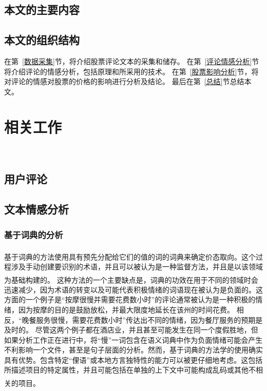 \documentclass[cs4size,a4paper]{ctexart}
\numberwithin{equation}{section}
\numberwithin{table}{section}
\numberwithin{figure}{section}
\newcommand{\upcite}[1]{\textsuperscript{\textsuperscript{\cite{#1}}}}%
\begin{document}
\subsection{本文的主要内容}
 

\subsection{本文的组织结构}

在第~\ref{数据采集}节，将介绍股票评论文本的采集和储存。
在第~\ref{评论情感分析}节将介绍评论的情感分析，包括原理和所采用的技术。
在第~\ref{股票影响分析}节，将对评论的情感对股票的价格的影响进行分析及结论。
最后在第~\ref{总结}节总结本文。

\section{相关工作}~\label{related-work}
\subsection{用户评论}



\subsection{文本情感分析}



\subsubsection{基于词典的分析}

基于词典的方法使用具有预先分配给它们的值的词的词典来确定价态取向\upcite{chiu2015opinion}。这个过程涉及手动创建要识别的术语，并且可以被认为是一种监督方法，并且是以该领域为基础构建的\upcite{taboada2011lexicon}。
这种方法的一个主要缺点是，词典的功效在用于不同的领域时会迅速减少，因为术语的转变以及可能代表积极情绪的词语现在被认为是负面的。这方面的一个例子是“按摩很慢并需要花费数小时”的评论通常被认为是一种积极的情绪，因为按摩的目的是鼓励放松，并最大限度地延长在该州的时间花费。
相反，“晚餐服务很慢，需要花费数小时”传达出不同的情绪，因为餐厅服务的预期是及时的。
尽管这两个例子都在酒店业，并且甚至可能发生在同一个度假胜地，但如果分析工作正在进行中，将“慢”一词包含在语义词典中作为负面情绪可能会产生不利影响一个文件，甚至是句子层面的分析。然而，基于词典的方法学的使用确实具有优势。包含特定“俚语”或本地方言独特性的能力可以被更仔细地考虑。这包括所描述项目的特定属性，并且可能包括在单独的上下文中可能构成乱码或其他不相关的项目\upcite{taboada2011lexicon}。
\end{document}
